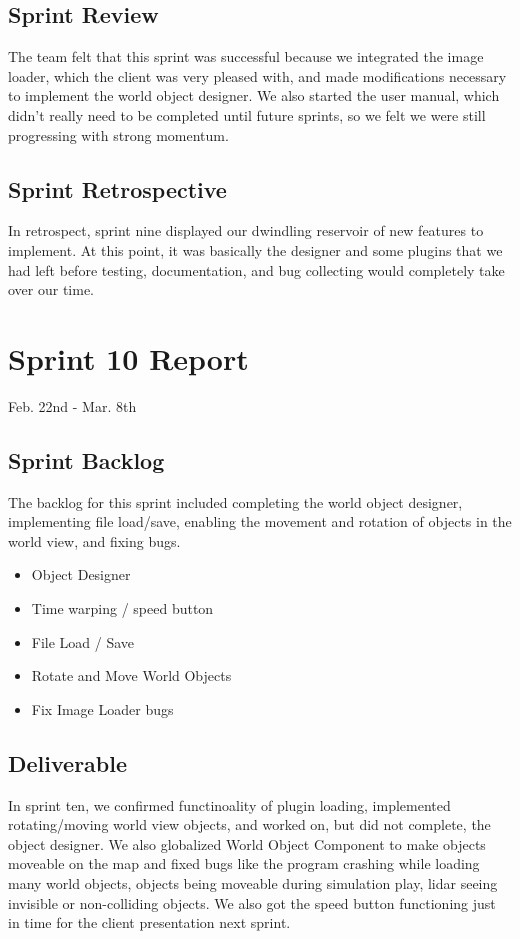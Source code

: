 \subsection{Sprint Review}

The team felt that this sprint was successful because we integrated the image loader, which the client was very pleased with, and made modifications necessary to implement the world object designer. We also started the user manual, which didn't really need to be completed until future sprints, so we felt we were still progressing with strong momentum.

\subsection{Sprint Retrospective}

In retrospect, sprint nine displayed our dwindling reservoir of new features to implement. At this point, it was basically the designer and some plugins that we had left before testing, documentation, and bug collecting would completely take over our time.

\section{Sprint 10 Report}
Feb. 22nd - Mar. 8th
\subsection{Sprint Backlog}

The backlog for this sprint included completing the world object designer, implementing file load/save, enabling the movement and rotation of objects in the world view, and fixing bugs.

\begin{itemize}
	\item Object Designer
	\item Time warping / speed button
	\item File Load / Save
	\item Rotate and Move World Objects
	\item Fix Image Loader bugs
\end{itemize}

\subsection{Deliverable}
In sprint ten, we confirmed functinoality of plugin loading, implemented rotating/moving world view objects, and worked on, but did not complete, the object designer. We also globalized World Object Component to make objects moveable on the map and fixed bugs like the program crashing while loading many world objects, objects being moveable during simulation play, lidar seeing invisible or non-colliding objects. We also got the speed button functioning just in time for the client presentation next sprint.
 

